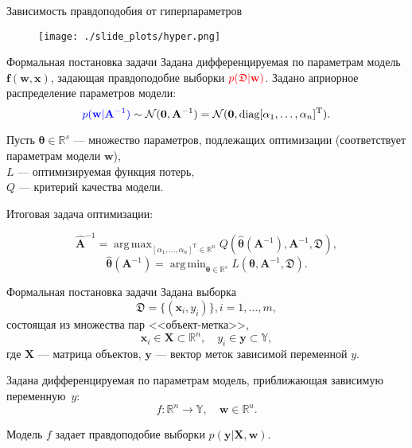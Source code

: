 \documentclass[11pt,pdf,utf8,russian,aspectratio=169]{beamer}
\DeclareMathOperator*{\argmin}{arg\,min}
\DeclareMathOperator*{\argmax}{arg\,max}
\begin{document}
\begin{frame}{Зависимость правдоподобия от гиперпараметров}
           
\begin{figure}[h]                                                                                                                               
\centering  
   \texttt{[image: ./slide\_plots/hyper.png]}
\end{figure}
\end{frame}


\begin{frame}{Формальная постановка задачи}
Задана дифференцируемая по параметрам модель $\mathbf{f}(\mathbf{w}, \mathbf{x})$, задающая правдоподобие выборки $\textcolor{red}{p(\mathfrak{D}| \mathbf{w})}$.
Задано априорное распределение параметров модели:
\[
    \textcolor{blue}{p(\mathbf{w}|\mathbf{A}^{-1}) }\sim \mathcal{N}(\mathbf{0}, \mathbf{A}^{-1}) = \mathcal{N}(\mathbf{0}, \text{diag} [\alpha_1, \dots, \alpha_n]^\text{T}).
\]

Пусть $\boldsymbol{\theta}  \in \mathbb{R}^s$ --- множество параметров, подлежащих оптимизации (соответствует параметрам модели $\mathbf{w}$), \\
$L$ --- оптимизируемая функция потерь, \\$Q$ --- критерий качества модели.


Итоговая задача оптимизации:

\[
	\hat{\mathbf{A}}^{-1} = \argmax_{[\alpha_1, \dots, \alpha_n]^\text{T} \in \mathbb{R}^n} Q(\hat{\boldsymbol{\theta}}(\mathbf{A}^{-1}), \mathbf{A}^{-1}, \mathfrak{D}),
\]
\[
	\hat{\boldsymbol{\theta}}(\mathbf{A}^{-1}) =  \argmin_{\boldsymbol{\theta} \in \mathbb{R}^s} L(\boldsymbol{\theta}, \mathbf{A}^{-1}, \mathfrak{D}).
\]


\end{frame}

\iffalse
\begin{frame}{Формальная постановка задачи}
Задана выборка  \begin{equation}\label{eq:dataset}\mathfrak{D} = \{(\mathbf{x}_i,y_i)\}, i = 1,\dots,m,\end{equation} состоящая из множества пар <<объект-метка>>, $$\mathbf{x}_i \in \mathbf{X} \subset \mathbb{R}^n, \quad {y}_i \in \mathbf{y} \subset \mathbb{Y},$$ где $\mathbf{X}$ --- матрица объектов,  $\mathbf{y}$ --- вектор меток зависимой переменной $y$. 

Задана дифференцируемая по параметрам модель, приближающая зависимую переменную~$y$:
\[
	f:\mathbb{R}^n \to \mathbb{Y}, \quad \mathbf{w} \in \mathbb{R}^u.
\]

Модель $f$ задает правдоподобие выборки $p(\mathbf{y}|\mathbf{X}, \mathbf{w})$.
\end{frame}
\end{document}
